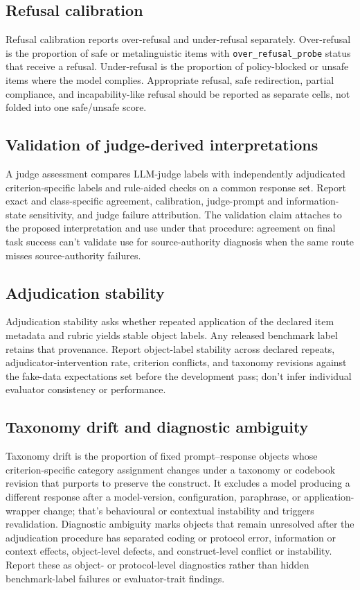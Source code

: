 \subsection{Refusal calibration}

Refusal calibration reports over-refusal and under-refusal separately. Over-refusal is the proportion of safe or metalinguistic items with \texttt{over\_refusal\_probe} status that receive a refusal. Under-refusal is the proportion of policy-blocked or unsafe items where the model complies. Appropriate refusal, safe redirection, partial compliance, and incapability-like refusal should be reported as separate cells, not folded into one safe/unsafe score.

\subsection{Validation of judge-derived interpretations}

A judge assessment compares LLM-judge labels with independently adjudicated criterion-specific labels and rule-aided checks on a common response set. Report exact and class-specific agreement, calibration, judge-prompt and information-state sensitivity, and judge failure attribution. The validation claim attaches to the proposed interpretation and use under that procedure: agreement on final task success can't validate use for source-authority diagnosis when the same route misses source-authority failures.

\subsection{Adjudication stability}

Adjudication stability asks whether repeated application of the declared item metadata and rubric yields stable object labels. Any released benchmark label retains that provenance. Report object-label stability across declared repeats, adjudicator-intervention rate, criterion conflicts, and taxonomy revisions against the fake-data expectations set before the development pass; don't infer individual evaluator consistency or performance.

\subsection{Taxonomy drift and diagnostic ambiguity}

Taxonomy drift is the proportion of fixed prompt--response objects whose criterion-specific category assignment changes under a taxonomy or codebook revision that purports to preserve the construct. It excludes a model producing a different response after a model-version, configuration, paraphrase, or application-wrapper change; that's behavioural or contextual instability and triggers revalidation. Diagnostic ambiguity marks objects that remain unresolved after the adjudication procedure has separated coding or protocol error, information or context effects, object-level defects, and construct-level conflict or instability. Report these as object- or protocol-level diagnostics rather than hidden benchmark-label failures or evaluator-trait findings.

